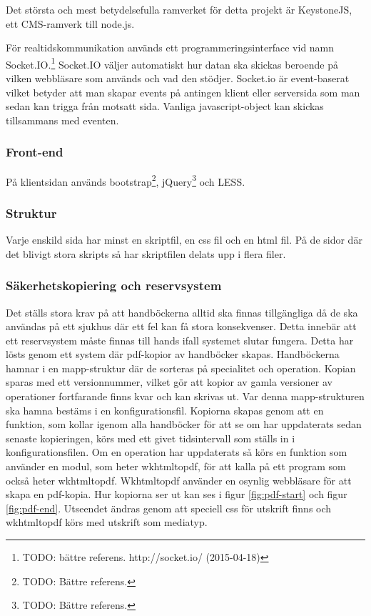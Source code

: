 Det största och mest betydelsefulla ramverket för detta projekt är KeystoneJS, ett CMS-ramverk till node.js.

För realtidskommunikation används ett programmeringsinterface vid namn Socket.IO.\footnote{TODO: bättre referens. http://socket.io/ (2015-04-18)}
Socket.IO väljer automatiskt hur datan ska skickas beroende på vilken webbläsare som används och vad den stödjer.
Socket.io är event-baserat vilket betyder att man skapar events på antingen klient eller serversida som man sedan kan trigga från motsatt sida.
Vanliga javascript-object kan skickas tillsammans med eventen.

\subsubsection{Front-end}
På klientsidan används bootstrap\footnote{TODO: Bättre referens.}, jQuery\footnote{TODO: Bättre referens.} och LESS.

\subsubsection{Struktur}
Varje enskild sida har minst en skriptfil, en css fil och en html fil. På de sidor där det blivigt stora skripts så har skriptfilen delats upp i flera filer.

\subsubsection{Säkerhetskopiering och reservsystem}
Det ställs stora krav på att handböckerna alltid ska finnas tillgängliga då de ska användas på ett sjukhus där ett fel kan få stora konsekvenser. Detta innebär att ett reservsystem måste finnas till hands ifall systemet slutar fungera. Detta har lösts genom ett system där pdf-kopior av handböcker skapas. Handböckerna hamnar i en mapp-struktur där de sorteras på specialitet och operation. Kopian sparas med ett versionnummer, vilket gör att kopior av gamla versioner av operationer fortfarande finns kvar och kan skrivas ut. Var denna mapp-strukturen ska hamna bestäms i en konfigurationsfil.
Kopiorna skapas genom att en funktion, som kollar igenom alla handböcker för att se om har uppdaterats sedan senaste kopieringen, körs med ett givet tidsintervall som ställs in i konfigurationsfilen. Om en operation har uppdaterats så körs en funktion som använder en modul, som heter wkhtmltopdf, för att kalla på ett program som också heter wkhtmltopdf. Wkhtmltopdf använder en osynlig webbläsare för att skapa en pdf-kopia. Hur kopiorna ser ut kan ses i figur \ref{fig:pdf-start} och figur \ref{fig:pdf-end}. Utseendet ändras genom att speciell css för utskrift finns och wkhtmltopdf körs med utskrift som mediatyp.  

